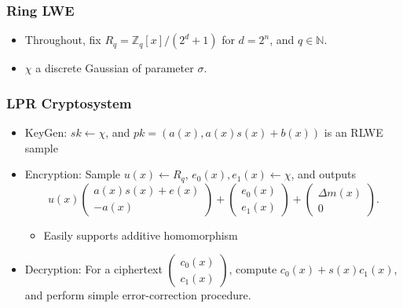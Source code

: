 \documentclass{beamer}
\theoremstyle{definition}
\newcommand{\Nset}{\mathbb{N}}
\begin{document}
\begin{frame}
	\frametitle{Ring LWE}
	\begin{itemize}
		\item Throughout, fix $R_q = \mathbb{Z}_q[x] / (2^d+1)$ for $d = 2^n$, and $q\in\Nset$.
		
		\pause{}
	\item $\chi$ a discrete Gaussian of parameter $\sigma$.
	\end{itemize}
	
\end{frame}

\begin{frame}
	\frametitle{LPR Cryptosystem}
	
	\begin{itemize}
		\item KeyGen: $sk\gets \chi$, and $pk = (a(x), a(x)s(x) + b(x))$ is an RLWE sample\pause{}
		\item Encryption: Sample $u(x)\gets R_q$, $e_0(x),e_1(x)\gets \chi$, and outputs
		\begin{equation*}
			u(x)\begin{pmatrix}
				a(x)s(x)+e(x)\\
				-a(x)
			\end{pmatrix} +\begin{pmatrix}
			e_0(x)\\e_1(x)
		\end{pmatrix}  + \begin{pmatrix}
		\Delta m(x)\\ 0
	\end{pmatrix}.
		\end{equation*}\pause{}
	\begin{itemize}
		\item Easily supports additive homomorphism\pause{}
	\end{itemize}
	\item Decryption: For a ciphertext $\begin{pmatrix}
		c_0(x)\\c_1(x)
	\end{pmatrix}$, compute $c_0(x) + s(x)c_1(x)$, and perform simple error-correction procedure.
	\end{itemize}
\end{frame}
\end{document}
